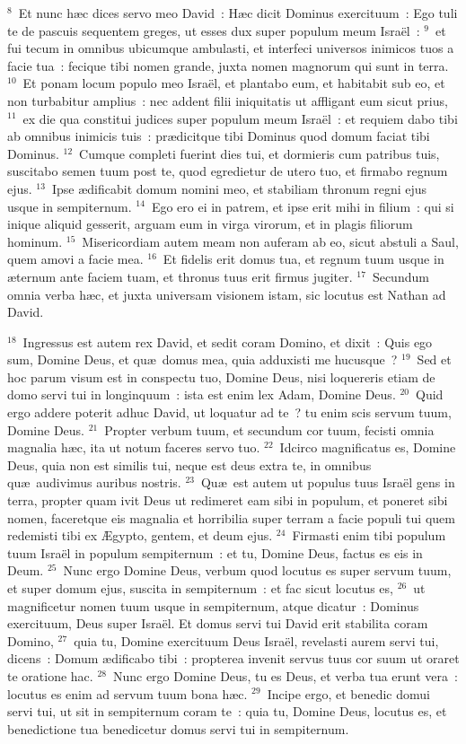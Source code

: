 ${}^{8}$~Et nunc h\ae c dices servo meo David~: H\ae c dicit Dominus exercituum~: Ego tuli te de pascuis sequentem greges, ut esses dux super populum meum Isra\"el~:
${}^{9}$~et fui tecum in omnibus ubicumque ambulasti, et interfeci universos inimicos tuos a facie tua~: fecique tibi nomen grande, juxta nomen magnorum qui sunt in terra.
${}^{10}$~Et ponam locum populo meo Isra\"el, et plantabo eum, et habitabit sub eo, et non turbabitur amplius~: nec addent filii iniquitatis ut affligant eum sicut prius,
${}^{11}$~ex die qua constitui judices super populum meum Isra\"el~: et requiem dabo tibi ab omnibus inimicis tuis~: pr\ae dicitque tibi Dominus quod domum faciat tibi Dominus.
${}^{12}$~Cumque completi fuerint dies tui, et dormieris cum patribus tuis, suscitabo semen tuum post te, quod egredietur de utero tuo, et firmabo regnum ejus.
${}^{13}$~Ipse \ae dificabit domum nomini meo, et stabiliam thronum regni ejus usque in sempiternum.
${}^{14}$~Ego ero ei in patrem, et ipse erit mihi in filium~: qui si inique aliquid gesserit, arguam eum in virga virorum, et in plagis filiorum hominum.
${}^{15}$~Misericordiam autem meam non auferam ab eo, sicut abstuli a Saul, quem amovi a facie mea.
${}^{16}$~Et fidelis erit domus tua, et regnum tuum usque in \ae ternum ante faciem tuam, et thronus tuus erit firmus jugiter.
${}^{17}$~Secundum omnia verba h\ae c, et juxta universam visionem istam, sic locutus est Nathan ad David.


${}^{18}$~Ingressus est autem rex David, et sedit coram Domino, et dixit~: Quis ego sum, Domine Deus, et qu\ae\ domus mea, quia adduxisti me hucusque~?
${}^{19}$~Sed et hoc parum visum est in conspectu tuo, Domine Deus, nisi loquereris etiam de domo servi tui in longinquum~: ista est enim lex Adam, Domine Deus.
${}^{20}$~Quid ergo addere poterit adhuc David, ut loquatur ad te~? tu enim scis servum tuum, Domine Deus.
${}^{21}$~Propter verbum tuum, et secundum cor tuum, fecisti omnia magnalia h\ae c, ita ut notum faceres servo tuo.
${}^{22}$~Idcirco magnificatus es, Domine Deus, quia non est similis tui, neque est deus extra te, in omnibus qu\ae\ audivimus auribus nostris.
${}^{23}$~Qu\ae\ est autem ut populus tuus Isra\"el gens in terra, propter quam ivit Deus ut redimeret eam sibi in populum, et poneret sibi nomen, faceretque eis magnalia et horribilia super terram a facie populi tui quem redemisti tibi ex \AE gypto, gentem, et deum ejus.
${}^{24}$~Firmasti enim tibi populum tuum Isra\"el in populum sempiternum~: et tu, Domine Deus, factus es eis in Deum.
${}^{25}$~Nunc ergo Domine Deus, verbum quod locutus es super servum tuum, et super domum ejus, suscita in sempiternum~: et fac sicut locutus es,
${}^{26}$~ut magnificetur nomen tuum usque in sempiternum, atque dicatur~: Dominus exercituum, Deus super Isra\"el. Et domus servi tui David erit stabilita coram Domino,
${}^{27}$~quia tu, Domine exercituum Deus Isra\"el, revelasti aurem servi tui, dicens~: Domum \ae dificabo tibi~: propterea invenit servus tuus cor suum ut oraret te oratione hac.
${}^{28}$~Nunc ergo Domine Deus, tu es Deus, et verba tua erunt vera~: locutus es enim ad servum tuum bona h\ae c.
${}^{29}$~Incipe ergo, et benedic domui servi tui, ut sit in sempiternum coram te~: quia tu, Domine Deus, locutus es, et benedictione tua benedicetur domus servi tui in sempiternum.


